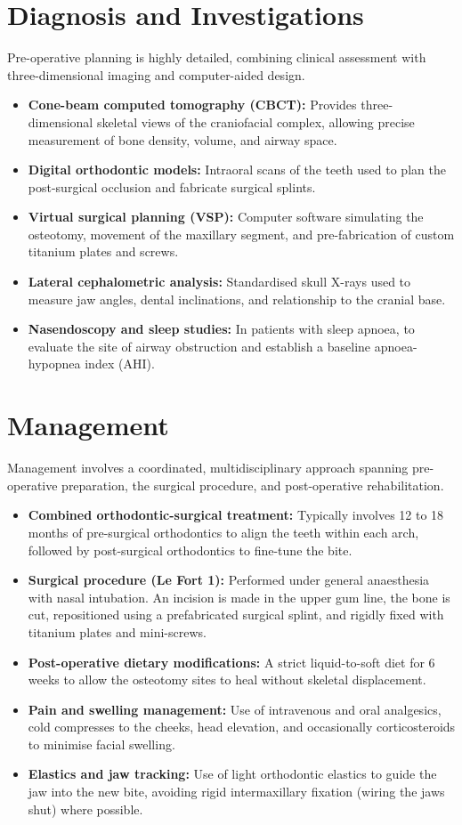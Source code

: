 \section*{Diagnosis and Investigations}
Pre-operative planning is highly detailed, combining clinical assessment with three-dimensional imaging and computer-aided design.
\begin{itemize}
    \item \textbf{Cone-beam computed tomography (CBCT):} Provides three-dimensional skeletal views of the craniofacial complex, allowing precise measurement of bone density, volume, and airway space.
    \item \textbf{Digital orthodontic models:} Intraoral scans of the teeth used to plan the post-surgical occlusion and fabricate surgical splints.
    \item \textbf{Virtual surgical planning (VSP):} Computer software simulating the osteotomy, movement of the maxillary segment, and pre-fabrication of custom titanium plates and screws.
    \item \textbf{Lateral cephalometric analysis:} Standardised skull X-rays used to measure jaw angles, dental inclinations, and relationship to the cranial base.
    \item \textbf{Nasendoscopy and sleep studies:} In patients with sleep apnoea, to evaluate the site of airway obstruction and establish a baseline apnoea-hypopnea index (AHI).
\end{itemize}

\section*{Management}
Management involves a coordinated, multidisciplinary approach spanning pre-operative preparation, the surgical procedure, and post-operative rehabilitation.
\begin{itemize}
    \item \textbf{Combined orthodontic-surgical treatment:} Typically involves 12 to 18 months of pre-surgical orthodontics to align the teeth within each arch, followed by post-surgical orthodontics to fine-tune the bite.
    \item \textbf{Surgical procedure (Le Fort 1):} Performed under general anaesthesia with nasal intubation. An incision is made in the upper gum line, the bone is cut, repositioned using a prefabricated surgical splint, and rigidly fixed with titanium plates and mini-screws.
    \item \textbf{Post-operative dietary modifications:} A strict liquid-to-soft diet for 6 weeks to allow the osteotomy sites to heal without skeletal displacement.
    \item \textbf{Pain and swelling management:} Use of intravenous and oral analgesics, cold compresses to the cheeks, head elevation, and occasionally corticosteroids to minimise facial swelling.
    \item \textbf{Elastics and jaw tracking:} Use of light orthodontic elastics to guide the jaw into the new bite, avoiding rigid intermaxillary fixation (wiring the jaws shut) where possible.
\end{itemize}

